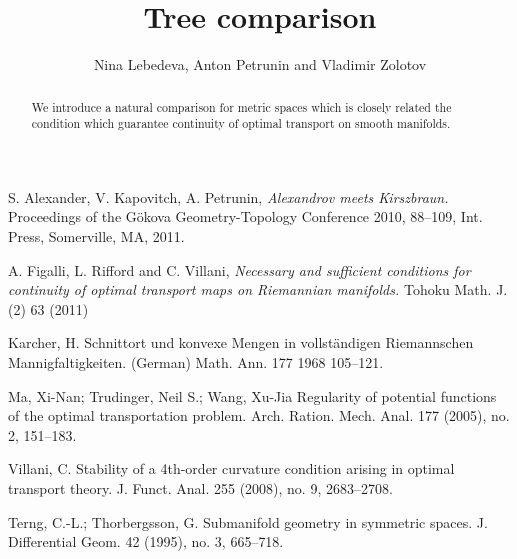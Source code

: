 \documentclass{article}
\begin{document}
\title{Tree comparison}
\author{Nina Lebedeva, Anton Petrunin and Vladimir Zolotov}


\newcommand{\Addresses}{{\bigskip\footnotesize
Anton Petrunin, \par\nopagebreak\textsc{Department of Mathematics, PSU, University Park, PA 16802, USA}
\par\nopagebreak
\textit{Email}: \texttt{petrunin@math.psu.edu}

\medskip
 
...
}}


\date{}

\maketitle

\begin{abstract}
We introduce a natural comparison for metric spaces which is closely related  the condition which guarantee continuity of optimal transport on smooth manifolds. 
\end{abstract}








\begin{thebibliography}{52}
 S. Alexander, V. Kapovitch, A. Petrunin, 
\emph{Alexandrov meets Kirszbraun.} 
Proceedings of the Gökova Geometry-Topology Conference 2010, 88--109, Int. Press, Somerville, MA, 2011.

A. Figalli, L. Rifford and C. Villani,
\emph{Necessary and sufficient conditions for continuity of optimal transport maps on Riemannian manifolds.} Tohoku Math. J. (2) 63 (2011)

Karcher, H.
Schnittort und konvexe Mengen in vollständigen Riemannschen Mannigfaltigkeiten. (German)
Math. Ann. 177 1968 105--121.

 Ma, Xi-Nan; Trudinger, Neil S.; Wang, Xu-Jia
Regularity of potential functions of the optimal transportation problem. 
Arch. Ration. Mech. Anal. 177 (2005), no. 2, 151--183. 

 Villani, C. Stability of a 4th-order curvature condition arising in optimal transport theory. J. Funct. Anal. 255 (2008), no. 9, 2683--2708.


 Terng, C.-L.; Thorbergsson, G. Submanifold geometry in symmetric spaces. J. Differential Geom. 42 (1995), no. 3, 665--718.
 
\end{thebibliography}
\end{document}
